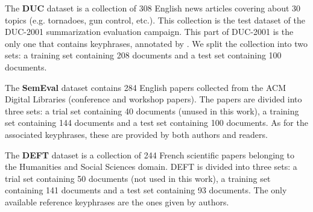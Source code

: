     The \textbf{DUC} dataset \cite{over2001duc} is a collection of 308 English
    news articles covering about 30 topics (e.g. tornadoes, gun control, etc.).
    This collection is the test dataset of the DUC-2001 summarization evaluation
    campaign. This part of DUC-2001 is the only one that contains keyphrases,
    annotated by . We split the collection into two
    sets: a training set containing 208 documents and a test set containing 100
    documents.

    The \textbf{SemEval} dataset \cite{kim2010semeval} contains 284 English
    papers collected from the ACM Digital Libraries (conference and workshop
    papers). The papers are divided into three sets: a trial set containing 40
    documents (unused in this work), a training set containing 144 documents and
    a test set containing 100 documents. As for the associated keyphrases, these
    are provided by both authors and readers.

    The \textbf{DEFT} dataset \cite{Paroubek2012deft} is a collection of 244
    French scientific papers belonging to the Humanities and Social Sciences
    domain. DEFT is divided into three sets: a trial set containing 50 documents
    (not used in this work), a training set containing 141 documents and a test
    set containing 93 documents. The only available reference keyphrases are the
    ones given by authors.

